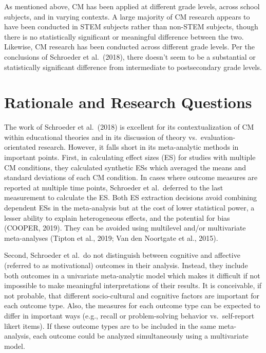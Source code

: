 \documentclass[
  letterpaper,
  DIV=11,
  numbers=noendperiod]{scrartcl}
\begin{document}
As mentioned above, CM has been applied at different grade levels,
across school subjects, and in varying contexts. A large majority of CM
research appears to have been conducted in STEM subjects rather than
non-STEM subjects, though there is no statistically significant or
meaningful difference between the two. Likewise, CM research has been
conducted across different grade levels. Per the conclusions of
Schroeder et al.~(2018), there doesn't seem to be a substantial or
statistically significant difference from intermediate to postsecondary
grade levels.

\hypertarget{rationale-and-research-questions}{%
\section{Rationale and Research
Questions}\label{rationale-and-research-questions}}

The work of Schroeder et al.~(2018) is excellent for its
contextualization of CM within educational theories and in its
discussion of theory vs.~evaluation-orientated research. However, it
falls short in its meta-analytic methods in important points. First, in
calculating effect sizes (ES) for studies with multiple CM conditions,
they calculated synthetic ESs which averaged the means and standard
deviations of each CM condition. In cases where outcome measures are
reported at multiple time points, Schroeder et al.~deferred to the last
measurement to calculate the ES. Both ES extraction decisions avoid
combining dependent ESs in the meta-analysis but at the cost of lower
statistical power, a lesser ability to explain heterogeneous effects,
and the potential for bias (COOPER, 2019). They can be avoided using
multilevel and/or multivariate meta-analyses (Tipton et al., 2019; Van
den Noortgate et al., 2015).

Second, Schroeder et al.~do not distinguish between cognitive and
affective (referred to as motivational) outcomes in their analysis.
Instead, they include both outcomes in a univariate meta-analytic model
which makes it difficult if not impossible to make meaningful
interpretations of their results. It is conceivable, if not probable,
that different socio-cultural and cognitive factors are important for
each outcome type. Also, the measures for each outcome type can be
expected to differ in important ways (e.g., recall or problem-solving
behavior vs.~self-report likert items). If these outcome types are to be
included in the same meta-analysis, each outcome could be analyzed
simultaneously using a multivariate model.
\end{document}
